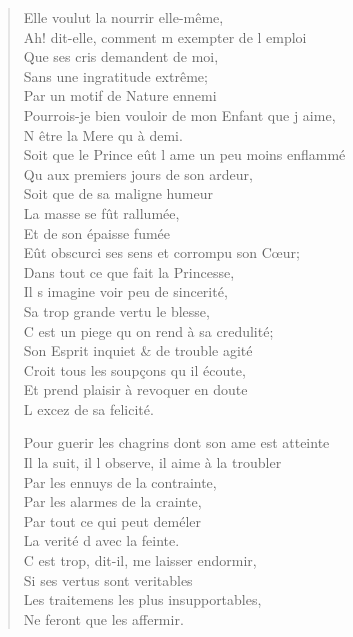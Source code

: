 \begin{verse}
\vin Elle voulut la nourrir elle-même, \\
Ah! dit-elle, comment m\textquotesingle{} exempter de l\textquotesingle{} emploi \\
\vin Que ses cris demandent de moi, \\
\vin Sans une ingratitude extrême; \\
\vin Par un motif de Nature ennemi \\
Pourrois-je bien vouloir de mon Enfant que j\textquotesingle{} aime, \\
\vin N\textquotesingle{} être la Mere qu\textquotesingle{} à demi. \\
Soit que le Prince eût l\textquotesingle{} ame un peu moins enflammé \\
\vin Qu\textquotesingle{} aux premiers jours de son ardeur, \\
\vin Soit que de sa maligne humeur \\
\vin La masse se fût rallumée, \\
\vin Et de son épaisse fumée \\
Eût obscurci ses sens et corrompu son Cœur; \\
\vin Dans tout ce que fait la Princesse, \\
Il s\textquotesingle{} imagine voir peu de sincerité, \\
\vin Sa trop grande vertu le blesse, \\
C\textquotesingle{} est un piege qu\textquotesingle{} on rend à sa credulité; \\
Son Esprit inquiet \& de trouble agité \\
\vin Croit tous les soupçons qu\textquotesingle{} il écoute, \\
\vin Et prend plaisir à revoquer en doute \\
\vin L\textquotesingle{} excez de sa felicité.

Pour guerir les chagrins dont son ame est atteinte \\
Il la suit, il l\textquotesingle{} observe, il aime à la troubler \\
\vin Par les ennuys de la contrainte, \\
\vin Par les alarmes de la crainte, \\
\vin Par tout ce qui peut deméler \\
\vin La verité d\textquotesingle{} avec la feinte. \\
\vin C\textquotesingle{} est trop, dit-il, me laisser endormir, \\
\vin Si ses vertus sont veritables \\
\vin Les traitemens les plus insupportables, \\
\vin Ne feront que les affermir.


\end{verse}
